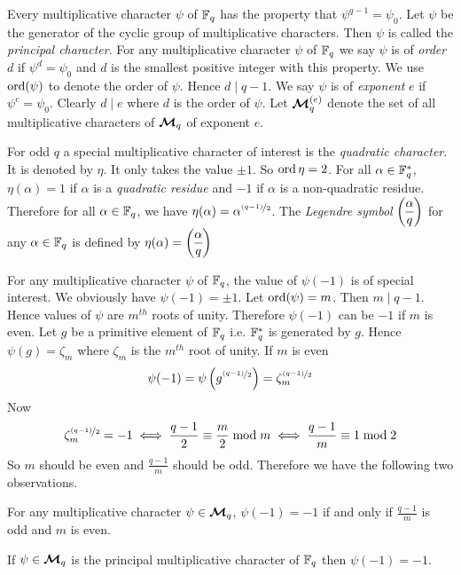 Every multiplicative character $\psi$ of $\mathbb{F}_q$ has the property that $\psi^{q-1}=\psi_0$. Let $\psi$ be the generator of the cyclic group of multiplicative characters. Then $\psi$ is called the \emph{principal character}. For any multiplicative character $\psi$ of $\mathbb{F}_q$ we say $\psi$ is of \emph{order} $d$ if $\psi^d=\psi_0$ and $d$ is the smallest positive integer with this property. We use $\operatorname{ord}(\psi)$ to denote the order of $\psi$. Hence $d\mid q-1$. We say $\psi$ is of \emph{exponent} $e$ if $\psi^e=\psi_0$. Clearly $d\mid e$ where $d$ is the order of $\psi$. Let $\boldsymbol{\mathcal{M}}_q^{(e)}$ denote the set of all multiplicative characters of $\boldsymbol{\mathcal{M}}_q$ of exponent $e$. 

\begin{note}
  For odd $q$ a special multiplicative character of interest is the \emph{quadratic character}. It is denoted by $\eta$. It only takes the value $\pm1$. So $\operatorname{ord}{\eta}=2$. For all $\alpha\in \mathbb{F}_q^*$, $\eta(\alpha)=1$ if $\alpha$ is a \emph{quadratic residue} and $-1$ if $\alpha$ is a non-quadratic residue. Therefore for all $\alpha\in\mathbb{F}_q$, we have $\eta(\alpha)=\alpha^{\nicefrac{(q-1)}{2}}$. The \emph{Legendre symbol} $\Leg{\alpha}{q}$ for any $\alpha\in\mathbb{F}_q$ is defined by $\eta(\alpha)=\Leg{\alpha}{q}$
\end{note}

For any multiplicative character $\psi$ of $\mathbb{F}_q$, the value of $\psi(-1)$ is of special interest. We obviously have $\psi(-1)=\pm 1$. Let $\operatorname{ord}(\psi)=m$. Then $m\mid q-1$. Hence values of $\psi$ are $m^{th}$ roots of unity. Therefore $\psi(-1)$ can be $-1$ if $m$ is even. Let $g$ be a primitive element of $\mathbb{F}_q$ i.e. $\mathbb{F}_q^*$ is generated by $g$. Hence $\psi(g)=\zeta_m$ where $\zeta_m$ is the $m^{th}$ root of unity. If $m$ is even $$\psi(-1)=\psi\left(g^{\nicefrac{(q-1)}2}\right)=\zeta_m^{\nicefrac{(q-1)}2}$$Now $$\zeta_m^{\nicefrac{(q-1)}2}=-1 \iff \frac{q-1}2\equiv \frac{m}2\bmod m \iff \frac{q-1}m\equiv 1\bmod 2$$So $m$ should be even and $\frac{q-1}m$ should be odd. Therefore we have the following two observations.

\begin{observation}\label{obs:char-at--1}
  For any multiplicative character $\psi\in\boldsymbol{\mathcal{M}}_q$, $\psi(-1)=-1$ if and only if $\frac{q-1}m$ is odd and $m$ is even.
\end{observation}
\begin{observation}
  If $\psi\in\boldsymbol{\mathcal{M}}_q$ is the principal multiplicative character of $\mathbb{F}_q$ then $\psi(-1)=-1$. 
\end{observation}


